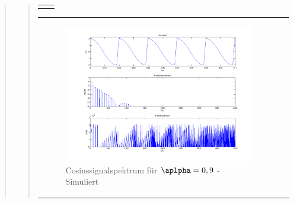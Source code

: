 \begin{quote}
\begin{quote}
\begin{center}
\begin{tabular}{ll}
\begin{minipage}{0.6\textwidth}
                \end{minipage}

            \end{tabular}
            \end{center}

            \begin{center}
            \begin{tabular}{ll}

            \hspace{-12em}
                \begin{minipage}{0.6\textwidth}

                    \begin{figure}[H]
                        \label{fig:}            
                        \includegraphics[scale=0.25]{./Bilder/cos_alpha9.png} %
                        \caption{Cosinssignalspektrum für $\aplpha = 0,9$ - Simuliert}
                    \end{figure}

                \end{minipage}
                \begin{minipage}{0.6\textwidth}


\end{minipage}
\end{tabular}
\end{center}
\end{quote}
\end{quote}
